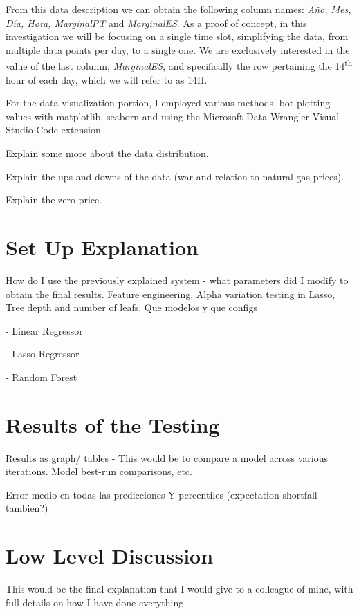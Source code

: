 \documentclass[12pt]{report} %
\begin{document}
From this data description we can obtain the following column names: \textit{Año, Mes, Día, Hora, MarginalPT} and \textit{MarginalES}. As a proof of concept, in this investigation we will be focusing on a single time slot, simplifying the data, from multiple data points per day, to a single one. We are exclusively interested in the value of the last column, \textit{MarginalES}, and specifically the row pertaining the 14\textsuperscript{th} hour of each day, which we will refer to as 14H.

For the data visualization portion, I employed various methods, bot plotting values with matplotlib, seaborn and using the Microsoft Data Wrangler Visual Studio Code extension.

Explain some more about the data distribution.

Explain the ups and downs of the data (war and relation to natural gas prices).

Explain the zero price.

\section{Set Up Explanation}
How do I use the previously explained system - what parameters did I modify to obtain the final results. Feature engineering, Alpha variation testing in Lasso, Tree depth and number of leafs.
Que modelos y que configs

- Linear Regressor

- Lasso Regressor

- Random Forest

\section{Results of the Testing}
Results as graph/ tables - This would be to compare a model across various iterations. Model best-run comparisons, etc.

Error medio en todas las predicciones
Y percentiles (expectation shortfall tambien?)

\section{Low Level Discussion} %
This would be the final explanation that I would give to a colleague of mine, with full details on how I have done everything
\end{document}

